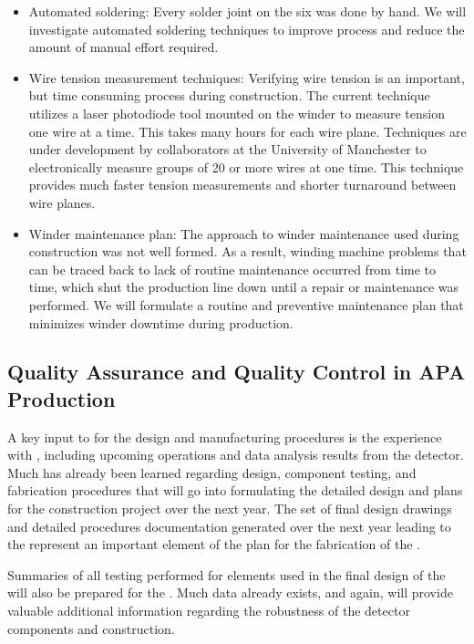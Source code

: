 \begin{itemize}
\item Automated soldering: Every solder joint on the six   was done by hand. We will investigate automated soldering techniques to improve process and reduce the amount of manual effort required. 

\item Wire tension measurement techniques: Verifying wire tension is an important, but time consuming process during construction. The current technique utilizes a laser photodiode tool mounted on the winder to measure tension one wire at a time. This takes many hours for each wire plane. Techniques are under development by collaborators at the University of Manchester  to electronically measure groups of \num{20} or more wires at one time. This technique  provides much faster tension measurements and shorter turnaround between wire planes. 

\item Winder maintenance plan: The approach to winder maintenance used during  construction was not well formed. As a result, winding machine problems that can be traced back to lack of routine maintenance occurred from time to time, which shut the production line down until a repair or maintenance was performed. We will formulate a routine and preventive maintenance plan that minimizes winder downtime during  production.
\end{itemize}


\subsection{Quality Assurance and Quality Control in APA Production}
\label{sec:fdsp-apa-qa}

A key input to  for the  design and manufacturing procedures is the experience with , including upcoming operations and data analysis results from the detector.  Much has already been learned regarding design, component testing, and fabrication procedures that will go into formulating the detailed design and plans for the %
 construction project over the next year.  The set of final design drawings and detailed procedures documentation generated over the next year leading to the  represent an important element of the  plan for the fabrication of the .  

Summaries of all  testing performed for elements used in the final design of the  will also be prepared for the .  Much data already exists, and again,  will provide valuable additional information regarding the robustness of the detector components and construction.  

